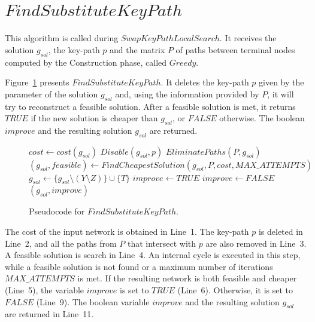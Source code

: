 \section*{$FindSubstituteKeyPath$}
This algorithm is called during $SwapKeyPathLocalSearch$. 
It receives the solution $g_{sol}$, the key-path $p$ and the matrix $P$ 
of paths between terminal nodes computed by the Construction phase, called $Greedy$. 

Figure~\ref{fskp} presents $FindSubstituteKeyPath$. It deletes the key-path $p$ given by the parameter of the solution $g_{sol}$ and, using the information provided by $P$, it will try to reconstruct a 
feasible solution. After a feasible solution is met, it returns $TRUE$ if the 
new solution is cheaper than $g_{sol}$, or $FALSE$ otherwise. The boolean $improve$ and the 
resulting solution $g_{sol}$ are returned.  

\begin{figure}[H]
\begin{algorithm}[H]
\caption{$(g_{sol},improve) = FindSubstituteKeyPath(g_{sol},p,P,improve)$}
\begin{algorithmic}[1]
\STATE $cost \leftarrow cost(g_{sol})$
\STATE $Disable(g_{sol},p)$
\STATE $EliminatePaths(P,g_{sol})$
\STATE $(g_{sol},feasible) \leftarrow FindCheapestSolution(g_{sol},P,cost,MAX\_ATTEMPTS)$
\STATE $g_{sol} \leftarrow \{ g_{sol}\setminus  (Y\setminus Z) \} \cup \{T\}$
\STATE $improve \leftarrow TRUE$
\ELSE
\STATE $improve \leftarrow FALSE$
\ENDIF
\RETURN $(g_{sol},improve)$
\end{algorithmic}
\end{algorithm}
\caption{Pseudocode for $FindSubstituteKeyPath$. \label{fskp}}
\end{figure}

The cost of the input network is obtained in Line~1. The key-path $p$ is deleted in Line~2, 
and all the paths from $P$ that intersect with $p$ are also removed in Line~3. 
A feasible solution is search in Line~4. An internal cycle is executed in this step, 
while a feasible solution is not found or a maximum number of iterations $MAX\_ATTEMPTS$ is met. 
If the resulting network is both feasible and cheaper (Line~5), the variable $improve$ is set to $TRUE$ (Line~6).  Otherwise, it is set to $FALSE$ (Line~9). The boolean variable $improve$ and the resulting 
solution $g_{sol}$ are returned in Line~11. 

